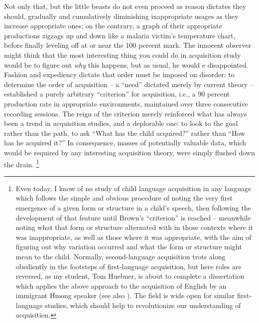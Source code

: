 Not only that, but the little beasts do not even proceed as reason dictates they should, gradually and cumulatively diminishing inappropriate usages as they increase appropriate ones; on the contrary, a graph of their appropriate productions zigzags up and down like a malaria victim's temperature chart, before finally leveling off at or near the 100 percent mark. The innocent observer might think that the most interesting thing you could do in acquisition study would be to figure out \textit{why} this happens, but as usual, he would e disappointed. Fashion and expediency dictate that order must be imposed on disorder: to determine the order of acquisition -- a ``need'' dictated merely by current theory -- \citet{Brown1973} established a purely arbitrary ``criterion'' for acquisition, i.e., a 90 percent production rate in appropriate environments, maintained over three consecutive recording sessions. The reign of the criterion merely reinforced what has always been
a trend in acquisition studies, and a deplorable one: to look to the goal rather than the path, to ask ``What has the child acquired?'' rather than ``How has he acquired it?'' In consequence, masses of potentially valuable data, which would be required by any interesting acquisition theory, were simply flushed down the drain.
\footnote{Even today, I know of no study of child language acquisition in any language which follows the simple and obvious procedure of noting the very first emergence of a given form or structure in a child's speech, then following the development of that feature until Brown's ``criterion'' is reached -- meanwhile noting what that form or structure alternated with in those contexts where it was inappropriate, as well as those where it was appropriate, with the aim of figuring out why variation occurred and what the form or structure might mean to the child. Normally, second-language acquisition trots along obediently in the footsteps of first-language acquisition, but here roles are reversed, as my student, Tom Huebner, is about to complete a dissertation which applies the above approach to the acquisition of English by an immigrant Hmong speaker (see also \citealt{Huebner1979}). The field is wide open for similar first-language studies, which should help to revolutionize our understanding of acquisition.\label{Fn1}}

